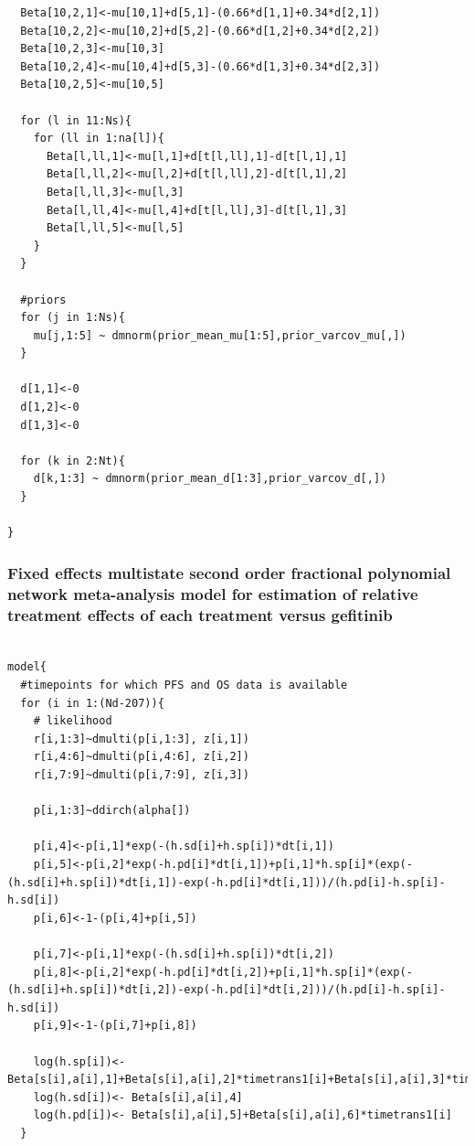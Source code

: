 \documentclass[11pt,final,fleqn]{article}\usepackage[]{graphicx}\usepackage[]{color}
\theoremstyle{plain}
\begin{document}
\begin{appendices}
\begin{verbatim}
  Beta[10,2,1]<-mu[10,1]+d[5,1]-(0.66*d[1,1]+0.34*d[2,1])
  Beta[10,2,2]<-mu[10,2]+d[5,2]-(0.66*d[1,2]+0.34*d[2,2])
  Beta[10,2,3]<-mu[10,3]
  Beta[10,2,4]<-mu[10,4]+d[5,3]-(0.66*d[1,3]+0.34*d[2,3])
  Beta[10,2,5]<-mu[10,5]
  
  for (l in 11:Ns){
    for (ll in 1:na[l]){
      Beta[l,ll,1]<-mu[l,1]+d[t[l,ll],1]-d[t[l,1],1]
      Beta[l,ll,2]<-mu[l,2]+d[t[l,ll],2]-d[t[l,1],2]
      Beta[l,ll,3]<-mu[l,3]
      Beta[l,ll,4]<-mu[l,4]+d[t[l,ll],3]-d[t[l,1],3]
      Beta[l,ll,5]<-mu[l,5]
    }
  }
  
  #priors
  for (j in 1:Ns){
    mu[j,1:5] ~ dmnorm(prior_mean_mu[1:5],prior_varcov_mu[,]) 
  }
  
  d[1,1]<-0
  d[1,2]<-0
  d[1,3]<-0

  for (k in 2:Nt){
    d[k,1:3] ~ dmnorm(prior_mean_d[1:3],prior_varcov_d[,]) 
  }

}

\end{verbatim}

\subsubsection{Fixed effects multistate second order fractional polynomial network meta-analysis model for estimation of relative treatment effects of each treatment versus gefitinib}
\begin{verbatim} 

model{
  #timepoints for which PFS and OS data is available
  for (i in 1:(Nd-207)){
    # likelihood
    r[i,1:3]~dmulti(p[i,1:3], z[i,1]) 
    r[i,4:6]~dmulti(p[i,4:6], z[i,2]) 
    r[i,7:9]~dmulti(p[i,7:9], z[i,3]) 
    
    p[i,1:3]~ddirch(alpha[])
    
    p[i,4]<-p[i,1]*exp(-(h.sd[i]+h.sp[i])*dt[i,1])
    p[i,5]<-p[i,2]*exp(-h.pd[i]*dt[i,1])+p[i,1]*h.sp[i]*(exp(-(h.sd[i]+h.sp[i])*dt[i,1])-exp(-h.pd[i]*dt[i,1]))/(h.pd[i]-h.sp[i]-h.sd[i])
    p[i,6]<-1-(p[i,4]+p[i,5])
    
    p[i,7]<-p[i,1]*exp(-(h.sd[i]+h.sp[i])*dt[i,2])
    p[i,8]<-p[i,2]*exp(-h.pd[i]*dt[i,2])+p[i,1]*h.sp[i]*(exp(-(h.sd[i]+h.sp[i])*dt[i,2])-exp(-h.pd[i]*dt[i,2]))/(h.pd[i]-h.sp[i]-h.sd[i])
    p[i,9]<-1-(p[i,7]+p[i,8])
    
    log(h.sp[i])<- Beta[s[i],a[i],1]+Beta[s[i],a[i],2]*timetrans1[i]+Beta[s[i],a[i],3]*timetrans2[i]
    log(h.sd[i])<- Beta[s[i],a[i],4] 
    log(h.pd[i])<- Beta[s[i],a[i],5]+Beta[s[i],a[i],6]*timetrans1[i]
  }
  

\end{verbatim}
\end{appendices}
\end{document}
